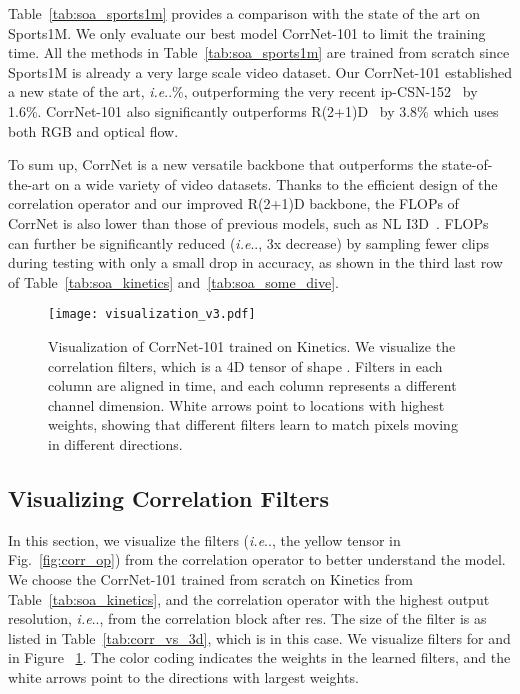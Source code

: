 \documentclass[10pt,twocolumn,letterpaper]{article}
\makeatletter
\DeclareRobustCommand\onedot{\futurelet\@let@token\@onedot}
\def\@onedot{\ifx\@let@token.\else.\null\fi\xspace}
\def\ie{\emph{i.e}\onedot} \def\Ie{\emph{I.e}\onedot}
\makeatother
\begin{document}
Table~\ref{tab:soa_sports1m} provides a comparison with the state of the art on Sports1M. We only evaluate our best model CorrNet-101 to limit the training time. All the methods in Table~\ref{tab:soa_sports1m} are trained from scratch since Sports1M is already a very large scale video dataset. Our CorrNet-101 established a new state of the art, \ie 77.1\%, outperforming the very recent ip-CSN-152~\cite{tran2019video} by 1.6\%. CorrNet-101 also significantly outperforms R(2+1)D~\cite{tran2017closer} by 3.8\% which uses both RGB and optical flow.

To sum up, CorrNet is a new versatile backbone that outperforms the state-of-the-art on a wide variety of video datasets. Thanks to the efficient design of the correlation operator and our improved R(2+1)D backbone, the FLOPs of CorrNet is also lower than those of previous models, such as NL I3D~\cite{wang2017non}. FLOPs can further be significantly reduced (\ie, 3x decrease) by sampling fewer clips during testing with only a small drop in accuracy, as shown in the third last row of Table~\ref{tab:soa_kinetics} and~\ref{tab:soa_some_dive}.

\begin{figure}
\begin{center}
   \texttt{[image: visualization\_v3.pdf]}
\end{center}
   \caption{Visualization of CorrNet-101 trained on Kinetics. We visualize the correlation filters, which is a 4D tensor of shape . Filters in each column are aligned in time, and each column represents a different channel dimension. White arrows point to locations with highest weights, showing that different filters learn to match pixels moving in different directions.}
\label{fig:vis_filter}
\end{figure}

\subsection{Visualizing Correlation Filters} \label{sec:visualize}
In this section, we visualize the filters (\ie, the yellow tensor in Fig.~\ref{fig:corr_op}) from the correlation operator to better understand the model. We choose the CorrNet-101 trained from scratch on Kinetics from Table~\ref{tab:soa_kinetics}, and the correlation operator with the highest output resolution, \ie, from the correlation block after res. The size of the filter is  as listed in Table~\ref{tab:corr_vs_3d}, which is  in this case. We visualize filters for  and  in Figure ~\ref{fig:vis_filter}. The color coding indicates the weights in the learned filters, and the white arrows point to the directions with largest weights.  
\end{document}
